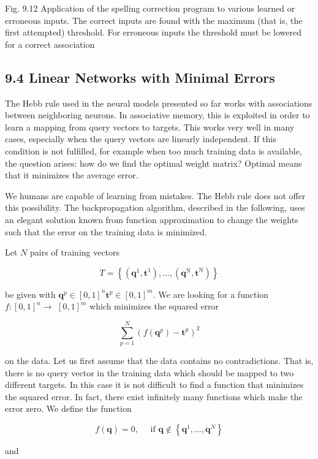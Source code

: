 \documentclass[10pt]{article}
\begin{document}
Fig. 9.12 Application of the spelling correction program to various learned or erroneous inputs. The correct inputs are found with the maximum (that is, the first attempted) threshold. For erroneous inputs the threshold must be lowered for a correct association

\subsection*{9.4 Linear Networks with Minimal Errors}
The Hebb rule used in the neural models presented so far works with associations between neighboring neurons. In associative memory, this is exploited in order to learn a mapping from query vectors to targets. This works very well in many cases, especially when the query vectors are linearly independent. If this condition is not fulfilled, for example when too much training data is available, the question arises: how do we find the optimal weight matrix? Optimal means that it minimizes the average error.

We humans are capable of learning from mistakes. The Hebb rule does not offer this possibility. The backpropagation algorithm, described in the following, uses an elegant solution known from function approximation to change the weights such that the error on the training data is minimized.

Let $N$ pairs of training vectors

$$
T=\left\{\left(\boldsymbol{q}^{1}, \boldsymbol{t}^{1}\right), \ldots,\left(\boldsymbol{q}^{\mathrm{N}}, \boldsymbol{t}^{\mathrm{N}}\right)\right\}
$$

be given with $\boldsymbol{q}^{p} \in[0,1]^{n} \boldsymbol{t}^{p} \in[0,1]^{m}$. We are looking for a function $f:[0,1]^{n} \rightarrow$ $[0,1]^{m}$ which minimizes the squared error

$$
\sum_{p=1}^{N}\left(f\left(\boldsymbol{q}^{p}\right)-\boldsymbol{t}^{p}\right)^{2}
$$

on the data. Let us first assume that the data contains no contradictions. That is, there is no query vector in the training data which should be mapped to two different targets. In this case it is not difficult to find a function that minimizes the squared error. In fact, there exist infinitely many functions which make the error zero. We define the function

$$
f(\boldsymbol{q})=0, \quad \text { if } \boldsymbol{q} \notin\left\{\boldsymbol{q}^{1}, \ldots, \boldsymbol{q}^{N}\right\}
$$

and
\end{document}
